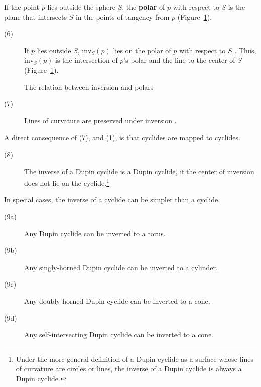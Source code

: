 \begin{defn2}
If the point $p$ lies outside the sphere $S$,
the {\bf polar} of $p$ with respect to $S$
is the plane that intersects $S$ in the points of tangency from $p$ 
(Figure~\ref{fig2}).
\end{defn2}

\begin{description}
\item[(6)]
\label{prop:polar}
If $p$ lies outside $S$, $\mbox{inv}_{S}(p)$ 
lies on the polar of $p$ with respect to $S$ \cite{Coo71}.
Thus, $\mbox{inv}_{S}(p)$ is the intersection of $p$'s polar
and the line to the center of $S$ (Figure~\ref{fig2}).
\end{description}


\begin{figure}
\vspace{2in}
\caption{The relation between inversion and polars}
\label{fig2}
\end{figure}

\begin{description}
\item[(7)]
Lines of curvature are preserved under inversion \cite{FISCH86}. %
\end{description}


A direct consequence of (7), and (1), is that cyclides are mapped to cyclides.

\begin{description}
\item[(8)]
The inverse of a Dupin cyclide is a Dupin cyclide,
if the center of inversion does not lie on the cyclide.\footnote{Under the
	more general definition of a Dupin cyclide as a surface whose lines
	of curvature are circles or lines,
	the inverse of a Dupin cyclide is always a Dupin cyclide.}
\end{description}

In special cases, the inverse of a cyclide can be simpler than a cyclide.

\begin{description}
\item[(9a)] Any Dupin cyclide can be inverted to a torus.
\item[(9b)] Any singly-horned Dupin cyclide can be inverted to a cylinder.
\item[(9c)] Any doubly-horned Dupin cyclide can be inverted to a cone.
\item[(9d)] Any self-intersecting Dupin cyclide can be inverted to a cone.
\end{description}

